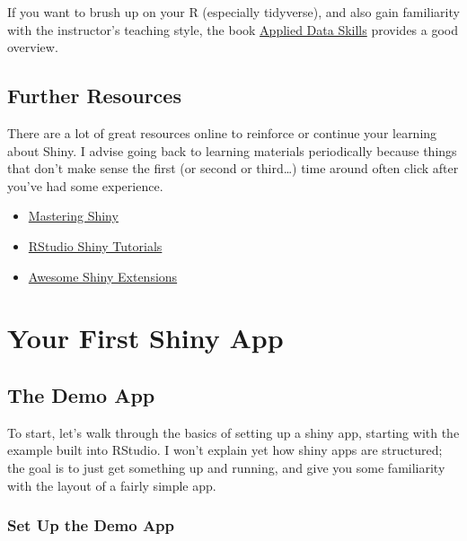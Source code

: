 \documentclass[
  oneside]{book}
\providecommand{\tightlist}{%
  \setlength{\itemsep}{0pt}\setlength{\parskip}{0pt}}
\begin{document}
If you want to brush up on your R (especially tidyverse), and also gain familiarity with the instructor's teaching style, the book \href{https://psyteachr.github.io/ads/}{Applied Data Skills} provides a good overview.

\hypertarget{further-resources}{%
\section{Further Resources}\label{further-resources}}

There are a lot of great resources online to reinforce or continue your learning about Shiny. I advise going back to learning materials periodically because things that don't make sense the first (or second or third\ldots) time around often click after you've had some experience.

\begin{itemize}
\tightlist
\item
  \href{https://mastering-shiny.org/}{Mastering Shiny}
\item
  \href{https://shiny.rstudio.com/tutorial/}{RStudio Shiny Tutorials}
\item
  \href{https://github.com/nanxstats/awesome-shiny-extensions}{Awesome Shiny Extensions}
\end{itemize}

\hypertarget{first-app}{%
\chapter{Your First Shiny App}\label{first-app}}

\hypertarget{the-demo-app}{%
\section{The Demo App}\label{the-demo-app}}

To start, let's walk through the basics of setting up a shiny app, starting with the example built into RStudio. I won't explain yet how shiny apps are structured; the goal is to just get something up and running, and give you some familiarity with the layout of a fairly simple app.

\hypertarget{set-up-the-demo-app}{%
\subsection{Set Up the Demo App}\label{set-up-the-demo-app}}
\end{document}
